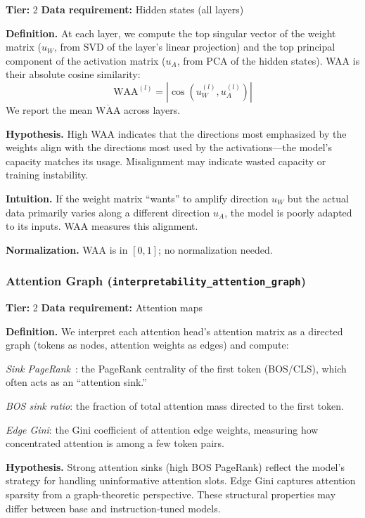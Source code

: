 \documentclass{article}
\begin{document}
\textbf{Tier:} 2 \quad \textbf{Data requirement:} Hidden states (all layers)

\textbf{Definition.}
At each layer, we compute the top singular vector of the weight matrix ($u_W$, from SVD of the layer's linear projection) and the top principal component of the activation matrix ($u_A$, from PCA of the hidden states). WAA is their absolute cosine similarity:
\begin{equation}
  \text{WAA}^{(l)} = |\cos(u_W^{(l)}, u_A^{(l)})|
\end{equation}
We report the mean $\overline{\text{WAA}}$ across layers.

\textbf{Hypothesis.}
High WAA indicates that the directions most emphasized by the weights align with the directions most used by the activations---the model's capacity matches its usage. Misalignment may indicate wasted capacity or training instability.

\textbf{Intuition.}
If the weight matrix ``wants'' to amplify direction $u_W$ but the actual data primarily varies along a different direction $u_A$, the model is poorly adapted to its inputs. WAA measures this alignment.

\textbf{Normalization.} WAA is in $[0, 1]$; no normalization needed.

\subsubsection{Attention Graph (\texttt{interpretability\_attention\_graph})}
\label{app:attn-graph}

\textbf{Tier:} 2 \quad \textbf{Data requirement:} Attention maps

\textbf{Definition.}
We interpret each attention head's attention matrix as a directed graph (tokens as nodes, attention weights as edges) and compute:

\emph{Sink PageRank}~\citep{xiao2023efficient}: the PageRank centrality of the first token (BOS/CLS), which often acts as an ``attention sink.''

\emph{BOS sink ratio}: the fraction of total attention mass directed to the first token.

\emph{Edge Gini}: the Gini coefficient of attention edge weights, measuring how concentrated attention is among a few token pairs.

\textbf{Hypothesis.}
Strong attention sinks (high BOS PageRank) reflect the model's strategy for handling uninformative attention slots. Edge Gini captures attention sparsity from a graph-theoretic perspective. These structural properties may differ between base and instruction-tuned models.
\end{document}
